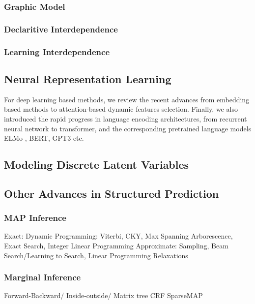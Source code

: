 \subsubsection{Graphic Model}

\subsubsection{Declaritive Interdependence}

\subsubsection{Learning Interdependence}

\subsection{Neural Representation Learning}
For deep learning based methods, we review the recent advances from
embedding based methods to attention-based dynamic features
selection. Finally, we also introduced the rapid progress in language
encoding architectures, from recurrent neural network to transformer,
and the corresponding pretrained language models ELMo , BERT, GPT3
etc.

\subsection{Modeling Discrete Latent Variables}

\subsection{Other Advances in Structured Prediction}
\subsubsection{MAP Inference}
Exact: Dynamic Programming: Viterbi, CKY, Max Spanning Arborescence, Exact Search, Integer Linear Programming
Approximate: Sampling, Beam Search/Learning to Search, Linear Programming Relaxations

\subsubsection{Marginal Inference}
Forward-Backward/ Inside-outside/ Matrix tree
CRF
SparseMAP

